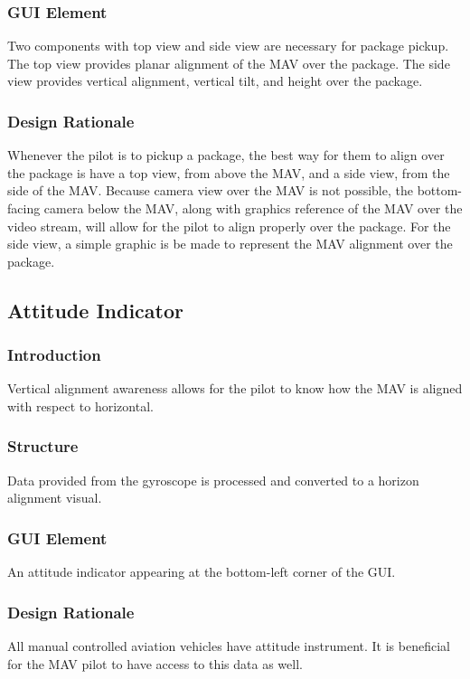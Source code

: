\documentclass[onecolumn, oneside, letterpaper, draftclsnofoot, 10pt, compsoc]{IEEEtran}
\begin{document}
\subsubsection{GUI Element}
Two components with top view and side view are necessary for package pickup. The top view provides planar alignment of the MAV over the package. The side view provides vertical alignment, vertical tilt, and height over the package.

\subsubsection{Design Rationale}
Whenever the pilot is to pickup a package, the best way for them to align over the package is have a top view, from above the MAV, and a side view, from the side of the MAV. Because camera view over the MAV is not possible, the bottom-facing camera below the MAV, along with graphics reference of the MAV over the video stream, will allow for the pilot to align properly over the package. For the side view, a simple graphic is be made to represent the MAV alignment over the package.

\subsection{Attitude Indicator}
\subsubsection{Introduction}
Vertical alignment awareness allows for the pilot to know how the MAV is aligned with respect to horizontal.

\subsubsection{Structure}
Data provided from the gyroscope is processed and converted to a horizon alignment visual.

\subsubsection{GUI Element}
An attitude indicator appearing at the bottom-left corner of the GUI.

\subsubsection{Design Rationale}
All manual controlled aviation vehicles have attitude instrument. It is beneficial for the MAV pilot to have access to this data as well.
\end{document}
